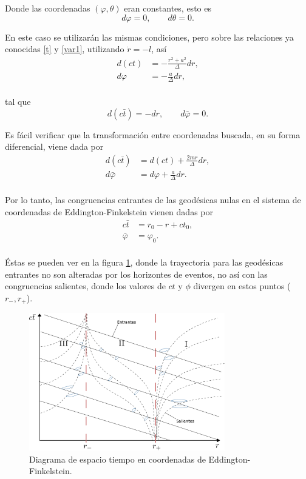 Donde las coordenadas $(\varphi,\theta )$ eran constantes, esto es
\begin{equation}
d\varphi=0, \qquad d\theta=0 .
\end{equation}

En este caso se utilizar\'an las mismas condiciones, pero sobre las relaciones ya conocidas \eqref{t} y \eqref{var1}, utilizando $\dot{r}=-l$, as\'i
\begin{equation}
\begin{aligned}
d(ct)&=-\frac{r^2+a^2}{\Delta}dr,\\
d \varphi&=-\frac{a}{\Delta}dr,\\
\end{aligned}
\end{equation}

tal que
\begin{equation}
d\left(c\bar{t}\right)=-dr, \qquad d\bar{\varphi}=0 .
\end{equation}

Es f\'acil verificar que la transformaci\'on entre coordenadas buscada, en su forma diferencial, viene dada por
\begin{equation}
\begin{aligned}
d\left(c\bar{t}\right)&=d(ct)+\frac{2mr}{\Delta}dr,\\
d\bar{\varphi}&=d	\varphi+\frac{a}{\Delta}dr.\\
\end{aligned}
\end{equation}

Por lo tanto, las congruencias entrantes de las geod\'esicas nulas  en el sistema de coordenadas de Eddington-Finkelstein vienen dadas por
\begin{equation}
\begin{aligned}
c\bar{t}&=r_0-r+ct_0,\\
\bar{\varphi}&=\varphi_0.\\
\end{aligned}
\end{equation}

\'Estas se pueden ver en la figura \ref{fig:conos2}, donde la trayectoria para las geod\'esicas entrantes no son alteradas por los horizontes de eventos, no as\'i con las congruencias salientes, donde los valores de $ct$ y $\phi$ divergen en estos puntos ($r_-,r_+$).\\
\begin{figure}[H]
 \centering
\includegraphics[height=6cm,angle=0]{fig/fig-conos2.pdf}
\caption{Diagrama de espacio tiempo en coordenadas de Eddington-Finkelstein.}
\label{fig:conos2}
\end{figure}

